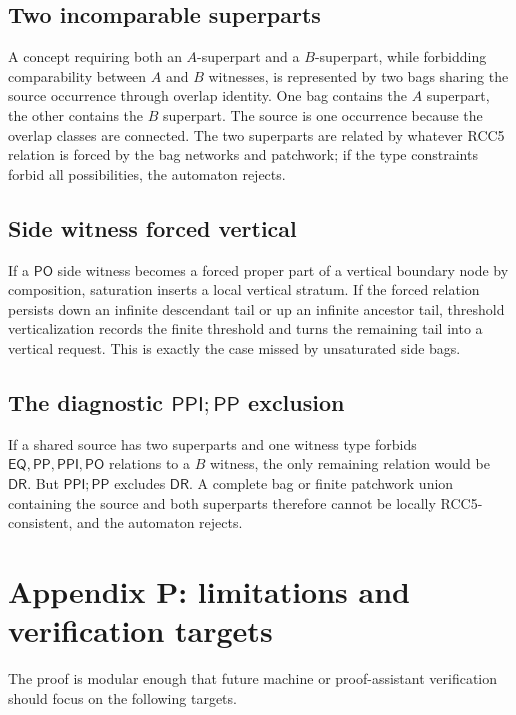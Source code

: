 \documentclass[11pt]{article}
\newcommand{\EQ}{\mathsf{EQ}}
\newcommand{\PP}{\mathsf{PP}}
\newcommand{\PPI}{\mathsf{PPI}}
\newcommand{\PO}{\mathsf{PO}}
\newcommand{\DR}{\mathsf{DR}}
\begin{document}
\subsection{Two incomparable superparts}

A concept requiring both an $A$-superpart and a $B$-superpart, while forbidding comparability between $A$ and $B$ witnesses, is represented by two bags sharing the source occurrence through overlap identity.  One bag contains the $A$ superpart, the other contains the $B$ superpart.  The source is one occurrence because the overlap classes are connected.  The two superparts are related by whatever RCC5 relation is forced by the bag networks and patchwork; if the type constraints forbid all possibilities, the automaton rejects.

\subsection{Side witness forced vertical}

If a $\PO$ side witness becomes a forced proper part of a vertical boundary node by composition, saturation inserts a local vertical stratum.  If the forced relation persists down an infinite descendant tail or up an infinite ancestor tail, threshold verticalization records the finite threshold and turns the remaining tail into a vertical request.  This is exactly the case missed by unsaturated side bags.

\subsection{The diagnostic $\PPI;\PP$ exclusion}

If a shared source has two superparts and one witness type forbids $\EQ,\PP,\PPI,\PO$ relations to a $B$ witness, the only remaining relation would be $\DR$.  But $\PPI;\PP$ excludes $\DR$.  A complete bag or finite patchwork union containing the source and both superparts therefore cannot be locally RCC5-consistent, and the automaton rejects.

\section{Appendix P: limitations and verification targets}

The proof is modular enough that future machine or proof-assistant verification should focus on the following targets.
\end{document}
